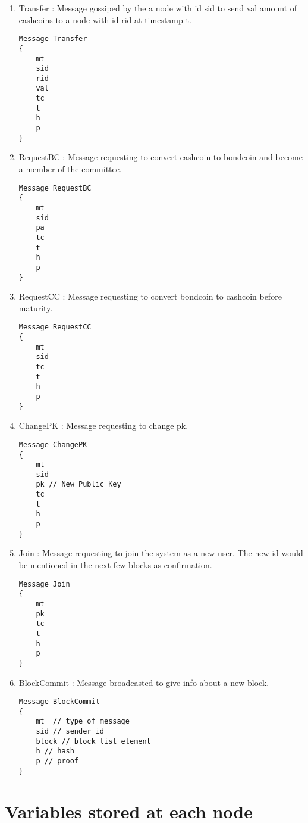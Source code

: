 {
\singlespacing
\begin{enumerate}
    \item Transfer : Message gossiped by the a node with id sid to send val amount of cashcoins to a node with id rid at timestamp t.
    \begin{verbatim}
Message Transfer
{
    mt
    sid
    rid
    val
    tc
    t
    h
    p
}
    \end{verbatim}
    \item RequestBC : Message requesting to convert cashcoin to bondcoin and become a member of the committee.
    \begin{verbatim}
Message RequestBC
{
    mt
    sid
    pa
    tc
    t
    h
    p
}
    \end{verbatim}
    \item RequestCC : Message requesting to convert bondcoin to cashcoin before maturity.
    \begin{verbatim}
Message RequestCC
{
    mt
    sid
    tc
    t
    h
    p
}
    \end{verbatim}
    \item ChangePK : Message requesting to change pk.
    \begin{verbatim}
Message ChangePK
{
    mt
    sid
    pk // New Public Key
    tc
    t
    h
    p
}
    \end{verbatim}
    \item Join : Message requesting to join the system as a new user. The new id would be mentioned in the next few blocks as confirmation.
    \begin{verbatim}
Message Join
{
    mt
    pk
    tc
    t
    h
    p
}
    \end{verbatim}
    \item BlockCommit : Message broadcasted to give info about a new block.
    \begin{verbatim}
Message BlockCommit
{
    mt  // type of message
    sid // sender id
    block // block list element
    h // hash
    p // proof
}
    \end{verbatim}
\end{enumerate}
}

\section{Variables stored at each node}


